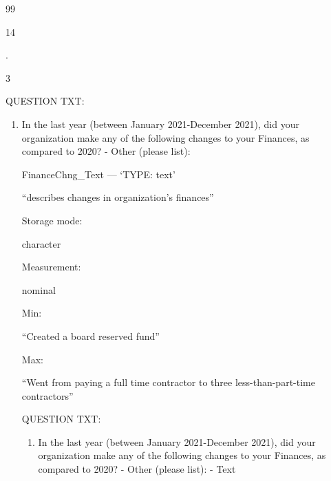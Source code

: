 \documentclass[
  letterpaper,
]{scrbook}
\providecommand{\tightlist}{%
  \setlength{\itemsep}{0pt}\setlength{\parskip}{0pt}}\usepackage{longtable,booktabs,array}
\begin{document}
\begin{enumerate}
\begin{enumerate}
\begin{enumerate}
\begin{enumerate}
\begin{enumerate}
\begin{enumerate}
            99

            14

            .

            3

            QUESTION TXT:

            \begin{enumerate}
            \def\labelenumvii{\arabic{enumvii}.}
            \tightlist
            \item
              In the last year (between January 2021-December 2021), did
              your organization make any of the following changes to
              your Finances, as compared to 2020? - Other (please list):

              FinanceChng\_Text --- {`TYPE: text'}

              ``describes changes in organization's finances''

              Storage mode:

              character

              Measurement:

              nominal

              Min:

              ``Created a board reserved fund''

              Max:

              ``Went from paying a full time contractor to three
              less-than-part-time contractors''

              QUESTION TXT:

              \begin{enumerate}
              \def\labelenumviii{\arabic{enumviii}.}
              \tightlist
              \item
                In the last year (between January 2021-December 2021),
                did your organization make any of the following changes
                to your Finances, as compared to 2020? - Other (please
                list): - Text
              \end{enumerate}
            \end{enumerate}
          \end{enumerate}
        \end{enumerate}
      \end{enumerate}
    \end{enumerate}
  \end{enumerate}
\end{enumerate}
\end{document}
